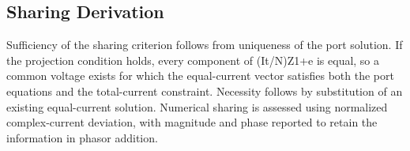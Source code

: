 \documentclass[journal,10pt]{IEEEtran}
\begin{document}
\subsection*{Sharing Derivation}
\hypertarget{A.sharing_derivation.heading}{}
Sufficiency of the sharing criterion follows from uniqueness of the port solution. If the projection condition holds, every component of (It/N)Z1+e is equal, so a common voltage exists for which the equal-current vector satisfies both the port equations and the total-current constraint. Necessity follows by substitution of an existing equal-current solution. Numerical sharing is assessed using normalized complex-current deviation, with magnitude and phase reported to retain the information in phasor addition.
\end{document}
